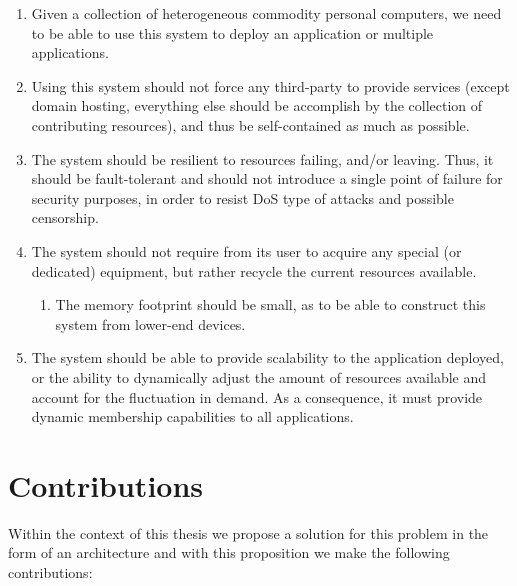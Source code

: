 \documentclass[12pt, titlepage]{uo_temp}
\begin{document}
     \begin{enumerate}[label={\bf Requirement \arabic*}, 
                       wide=\parindent,
                       leftmargin=\parindent, 
                       rightmargin=\parindent] \label{requirements}
     \item Given a collection of heterogeneous commodity personal computers, we need to be
       able to use this system to deploy an application or multiple applications.
     \item Using this system should not force any third-party to provide services (except
       domain hosting, everything else should be accomplish by the collection of
       contributing resources), and thus be self-contained as much as possible.
     \item The system should be resilient to resources failing, and/or leaving. Thus, it
       should be fault-tolerant and should not introduce a single point of failure for
       security purposes, in order to resist DoS type of attacks and possible censorship.
     \item The system should not require from its user to acquire any special (or
       dedicated) equipment, but rather recycle the current resources available.
     \begin{enumerate}[label={\bf Sub-Requirement \arabic*}, 
                       wide=\parindent,
                       leftmargin=\parindent, 
                       rightmargin=\parindent] 
     \item The memory footprint should be small, as to be able to construct this
       system from lower-end devices.
     \end{enumerate}
     \item The system should be able to provide scalability to the application deployed,
       or the ability to dynamically adjust the amount of resources available and account
       for the fluctuation in demand. As a consequence, it must provide dynamic membership
       capabilities to all applications.
     \end{enumerate}


     \section{Contributions}\label{contributions}
     Within the context of this thesis we propose a solution for this problem in the form
     of an architecture and with this proposition we make the following contributions:
     
\end{document}
